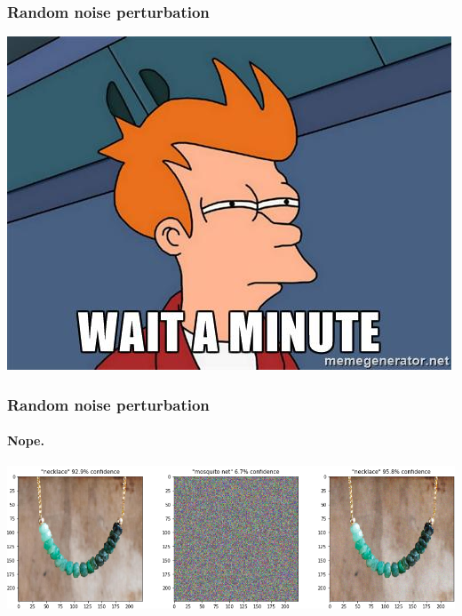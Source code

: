 \documentclass[9pt]{beamer}
\begin{document}
\begin{frame}
  \frametitle{Random noise perturbation}

  \begin{center}
    \includegraphics[width = 0.7 \linewidth]{images/wait-a-minute.jpg}
  \end{center}
\end{frame}

\begin{frame}
  \frametitle{Random noise perturbation}

  \framesubtitle{Nope.}

  \begin{center}
    \includegraphics[width = \linewidth]{images/random_perturbation.png}
  \end{center}

\end{frame}
\end{document}

